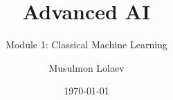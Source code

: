 \documentclass[aspectratio=169]{beamer}
\title{Advanced AI}
\subtitle{Module 1: Classical Machine Learning}
\author{Musulmon Lolaev}
\institute{TQQT LLC}
\date{\today}
\begin{document}
\begin{frame}
\titlepage
\end{frame}













\end{document}
